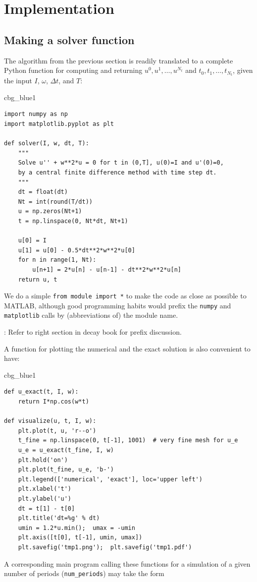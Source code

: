 \documentclass[%
oneside,                 %
final,                   %
10pt]{article}
\newenvironment{_cod_tight}[1]{
   \def\FrameCommand{\colorbox{#1}}
   \FrameRule0.6pt\MakeFramed {\FrameRestore}\vskip3mm}
   {\vskip0mm\endMakeFramed}
\newenvironment{cod}[1]{
\bgroup\rmfamily
\fboxsep=0mm\relax
\begin{_cod_tight}{#1}
\list{}{\parsep=-2mm\parskip=0mm\topsep=0pt\leftmargin=2mm
\rightmargin=2\leftmargin\leftmargin=4pt\relax}
\item\relax}
{\endlist\end{_cod_tight}\egroup}
\newcommand{\shortinlinecomment}[3]{{\color{red}{\bf #1}: #2}}
\begin{document}
\section{Implementation}
\label{vib:impl1}

\subsection{Making a solver function}
\label{vib:impl1:solver}

The algorithm from the previous section is readily translated to
a complete Python function for computing and returning
$u^0,u^1,\ldots,u^{N_t}$ and $t_0,t_1,\ldots,t_{N_t}$, given the
input $I$, $\omega$, $\Delta t$, and $T$:

\begin{cod}{cbg_blue1}\begin{Verbatim}[numbers=none,fontsize=\fontsize{9pt}{9pt},baselinestretch=0.95,xleftmargin=2mm]
import numpy as np
import matplotlib.pyplot as plt

def solver(I, w, dt, T):
    """
    Solve u'' + w**2*u = 0 for t in (0,T], u(0)=I and u'(0)=0,
    by a central finite difference method with time step dt.
    """
    dt = float(dt)
    Nt = int(round(T/dt))
    u = np.zeros(Nt+1)
    t = np.linspace(0, Nt*dt, Nt+1)

    u[0] = I
    u[1] = u[0] - 0.5*dt**2*w**2*u[0]
    for n in range(1, Nt):
        u[n+1] = 2*u[n] - u[n-1] - dt**2*w**2*u[n]
    return u, t
\end{Verbatim}
\end{cod}
\noindent
We do a simple \texttt{from module import *} to make the code as close as
possible to MATLAB, although good programming habits would prefix
the \texttt{numpy} and \texttt{matplotlib} calls by (abbreviations of) the module
name.

\shortinlinecomment{hpl 2}{ Refer to right section in decay book for prefix discussion. }{ Refer to right section }

A function for plotting the numerical and the exact solution is also
convenient to have:

\begin{cod}{cbg_blue1}\begin{Verbatim}[numbers=none,fontsize=\fontsize{9pt}{9pt},baselinestretch=0.95,xleftmargin=2mm]
def u_exact(t, I, w):
    return I*np.cos(w*t)

def visualize(u, t, I, w):
    plt.plot(t, u, 'r--o')
    t_fine = np.linspace(0, t[-1], 1001)  # very fine mesh for u_e
    u_e = u_exact(t_fine, I, w)
    plt.hold('on')
    plt.plot(t_fine, u_e, 'b-')
    plt.legend(['numerical', 'exact'], loc='upper left')
    plt.xlabel('t')
    plt.ylabel('u')
    dt = t[1] - t[0]
    plt.title('dt=%g' % dt)
    umin = 1.2*u.min();  umax = -umin
    plt.axis([t[0], t[-1], umin, umax])
    plt.savefig('tmp1.png');  plt.savefig('tmp1.pdf')
\end{Verbatim}
\end{cod}
\noindent
A corresponding main program calling these functions for a simulation
of a given number of periods (\Verb!num_periods!) may take the form
\end{document}

